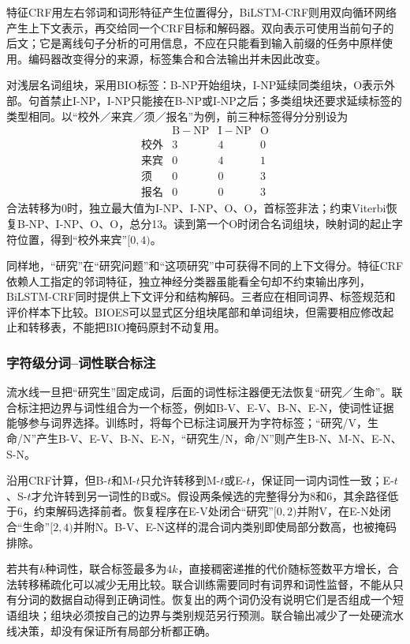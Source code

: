 特征CRF用左右邻词和词形特征产生位置得分，BiLSTM-CRF则用双向循环网络产生上下文表示，再交给同一个CRF目标和解码器。双向表示可使用当前句子的后文；它是离线句子分析的可用信息，不应在只能看到输入前缀的任务中原样使用。编码器改变得分的来源，标签集合和合法输出并未因此改变。

对浅层名词组块，采用BIO标签：B-NP开始组块，I-NP延续同类组块，O表示外部。句首禁止I-NP，I-NP只能接在B-NP或I-NP之后；多类组块还要求延续标签的类型相同。以“校外／来宾／须／报名”为例，前三种标签得分分别设为
\[
\begin{array}{c|rrr}
 &\mathrm{B\!-\!NP}&\mathrm{I\!-\!NP}&\mathrm O\\ \hline
 \text{校外}&3&4&0\\
 \text{来宾}&0&4&1\\
 \text{须}&0&0&3\\
 \text{报名}&0&0&3
\end{array}
\]
合法转移为0时，独立最大值为I-NP、I-NP、O、O，首标签非法；约束Viterbi恢复B-NP、I-NP、O、O，总分13。读到第一个O时闭合名词组块，映射词的起止字符位置，得到“校外来宾”$[0,4)$。

同样地，“研究”在“研究问题”和“这项研究”中可获得不同的上下文得分。特征CRF依赖人工指定的邻词特征，独立神经分类器虽能看全句却不约束输出序列，BiLSTM-CRF同时提供上下文评分和结构解码。三者应在相同词界、标签规范和评价样本下比较。BIOES可以显式区分组块尾部和单词组块，但需要相应修改起止和转移表，不能把BIO掩码原封不动复用。

\subsubsection{字符级分词--词性联合标注}
\label{sec:nlp-analysis-joint-pos}

流水线一旦把“研究生”固定成词，后面的词性标注器便无法恢复“研究／生命”。联合标注把边界与词性组合为一个标签，例如B-V、E-V、B-N、E-N，使词性证据能够参与词界选择。训练时，将每个已标注词展开为字符标签；“研究/V，生命/N”产生B-V、E-V、B-N、E-N，“研究生/N，命/N”则产生B-N、M-N、E-N、S-N。

沿用CRF计算，但B-$t$和M-$t$只允许转移到M-$t$或E-$t$，保证同一词内词性一致；E-$t$、S-$t$才允许转到另一词性的B或S。假设两条候选的完整得分为8和6，其余路径低于6，约束解码选择前者。恢复程序在E-V处闭合“研究”$[0,2)$并附V，在E-N处闭合“生命”$[2,4)$并附N。B-V、E-N这样的混合词内类别即使局部分数高，也被掩码排除。

若共有$k$种词性，联合标签最多为$4k$，直接稠密递推的代价随标签数平方增长，合法转移稀疏化可以减少无用比较。联合训练需要同时有词界和词性监督，不能从只有分词的数据自动得到正确词性。恢复出的两个词仍没有说明它们是否组成一个短语组块；组块必须按自己的边界与类别规范另行预测。联合输出减少了一处硬流水线决策，却没有保证所有局部分析都正确。

